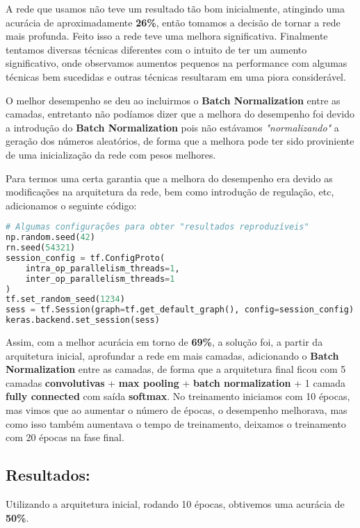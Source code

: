 A rede que usamos não teve um resultado tão bom inicialmente, atingindo uma
acurácia de aproximadamente \textbf{26\%}, então tomamos a decisão de tornar a
rede mais profunda. Feito isso a rede teve uma melhora significativa.
Finalmente tentamos diversas técnicas diferentes com o intuito de ter um aumento
significativo, onde observamos aumentos pequenos na performance com algumas
técnicas bem sucedidas e outras técnicas resultaram em uma piora considerável.

O melhor desempenho se deu ao incluirmos o \textbf{Batch Normalization} entre as
camadas, entretanto não podíamos dizer que a melhora do desempenho foi devido a
introdução do \textbf{Batch Normalization} pois não estávamos
\emph{"normalizando"} a geração dos números aleatórios, de forma que a
melhora pode ter sido proviniente de uma inicialização da rede com pesos
melhores.

Para termos uma certa garantia que a melhora do desempenho era devido as
modificações na arquitetura da rede, bem como introdução de regulação,
etc, adicionamos o seguinte código:

\begin{lstlisting}[language=Python]
# Algumas configurações para obter "resultados reproduzíveis"
np.random.seed(42)
rn.seed(54321)
session_config = tf.ConfigProto(
    intra_op_parallelism_threads=1,
    inter_op_parallelism_threads=1
)
tf.set_random_seed(1234)
sess = tf.Session(graph=tf.get_default_graph(), config=session_config)
keras.backend.set_session(sess)

\end{lstlisting}

Assim, com a melhor acurácia em torno de \textbf{69\%}, a solução
foi, a partir da arquitetura inicial, aprofundar a rede em mais camadas,
adicionando o \textbf{Batch Normalization} entre as camadas, de forma
que a arquitetura final ficou com 5 camadas \textbf{convolutivas} +
\textbf{max pooling} + \textbf{batch normalization} + 1 camada
\textbf{fully connected} com saída \textbf{softmax}. No treinamento
iniciamos com 10 épocas, mas vimos que ao aumentar o número de épocas, o
desempenho melhorava, mas como isso também aumentava o tempo de
treinamento, deixamos o treinamento com 20 épocas na fase final.

    \subsection{Resultados:}\label{resultados}

    Utilizando a arquitetura inicial, rodando 10 épocas, obtivemos uma acurácia de \textbf{50\%}.


